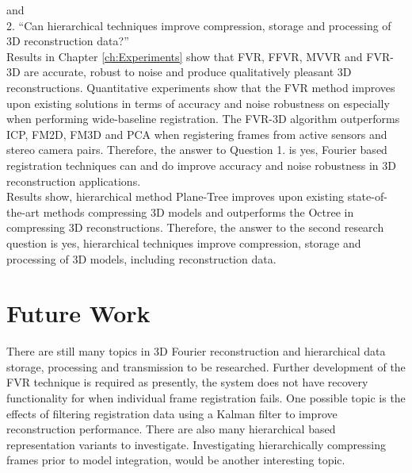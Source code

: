 and \\

2. ``Can hierarchical techniques improve compression, storage and processing of 3D reconstruction data?'' \\


Results in Chapter \ref{ch:Experiments} show that FVR, FFVR, MVVR and FVR-3D are accurate, robust to noise and produce qualitatively pleasant 3D reconstructions. Quantitative experiments show that the FVR method improves upon existing solutions in terms of accuracy and noise robustness on especially when performing wide-baseline registration. The FVR-3D algorithm outperforms ICP, FM2D, FM3D and PCA when registering frames from active sensors and stereo camera pairs. Therefore, the answer to Question 1. is yes, Fourier based registration techniques can and do improve accuracy and noise robustness in 3D reconstruction applications. \\


Results show, hierarchical method Plane-Tree improves upon existing state-of-the-art methods compressing 3D models and outperforms the Octree in compressing 3D reconstructions. Therefore, the answer to the second research question is yes, hierarchical techniques improve compression, storage and processing of 3D models, including reconstruction data. \\

\section{Future Work}

There are still many topics in 3D Fourier reconstruction and hierarchical data storage, processing and transmission to be researched. Further development of the FVR technique is required as presently, the system does not have recovery functionality for when individual frame registration fails. One possible topic is the effects of filtering registration data using a Kalman filter to improve reconstruction performance. There are also many hierarchical based representation variants to investigate. Investigating hierarchically compressing frames prior to model integration, would be another interesting topic. \\

